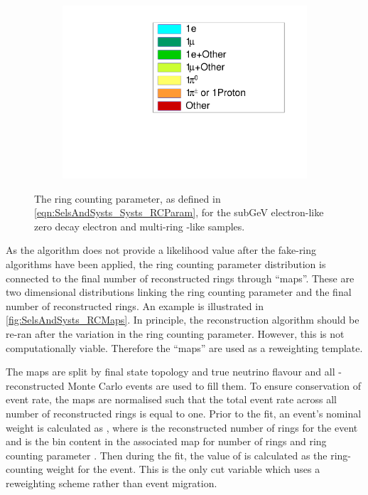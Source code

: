 \begin{figure}[h]
\begin{subfigure}[t]{0.49\textwidth}
    \includegraphics[width=\textwidth, trim={0mm 0mm 0mm 0mm}, clip,page=1]{Figures/Selections/RCParameterLegend.pdf}
  \end{subfigure}
  \caption{The ring counting parameter, as defined in \autoref{eqn:SelsAndSysts_Systs_RCParam}, for the subGeV electron-like zero decay electron and multi-ring -like samples.}
  \label{fig:SelsAndSysts_RCParameterDistribution}
\end{figure}

As the \fq algorithm does not provide a likelihood value after the fake-ring algorithms have been applied, the ring counting parameter distribution is connected to the final number of reconstructed rings through ``maps''. These are two dimensional distributions linking the ring counting parameter and the final number of reconstructed rings. An example is illustrated in \autoref{fig:SelsAndSysts_RCMaps}. In principle, the \fq reconstruction algorithm should be re-ran after the variation in the ring counting parameter. However, this is not computationally viable. Therefore the ``maps'' are used as a reweighting template.

The maps are split by final state topology and true neutrino flavour and all \fq-reconstructed Monte Carlo events are used to fill them. To ensure conservation of event rate, the maps are normalised such that the total event rate across all number of reconstructed rings is equal to one. Prior to the fit, an event's nominal weight is calculated as , where  is the reconstructed number of rings for the  event and  is the bin content in the associated map for  number of rings and ring counting parameter . Then during the fit, the value of  is calculated as the ring-counting weight for the  event. This is the only cut variable which uses a reweighting scheme rather than event migration.

